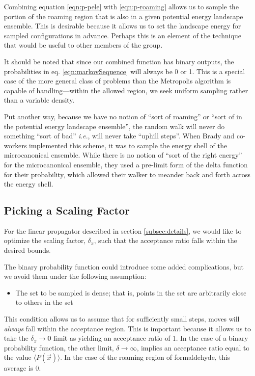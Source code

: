 \documentclass[letterpaper,12pt]{article}
\newcommand{\refeq}[1]{eq. \ref{eqn:#1}}
\begin{document}
Combining equation \ref{eqn:p-pele} with \ref{eqn:p-roaming} allows us to sample the portion of the roaming region that is also in a given potential energy landscape ensemble. This is desirable because it allows us to set the landscape energy for sampled configurations in advance. Perhaps this is an element of the technique that would be useful to other members of the group.

It should be noted that since our combined function has binary outputs, the probabilities in \refeq{markovSequence} will always be 0 or 1. This is a special case of the more general class of problems than the Metropolis algorithm is capable of handling---within the allowed region, we seek uniform sampling rather than a variable density.

Put another way, because we have no notion of ``sort of roaming'' or ``sort of in the potential energy landscape ensemble'', the random walk will never do something ``sort of bad'' \emph{i.e.}, will never take ``uphill steps''. When Brady and co-workers\cite{doll:1981} implemented this scheme, it was to sample the energy shell of the microcanonical ensemble. While there is no notion of ``sort of the right energy'' for the microcanonical ensemble, they used a pre-limit form of the delta function for their probability, which allowed their walker to meander back and forth across the energy shell.

\subsection{Picking a Scaling Factor}\label{subsec:pick-constant}
For the linear propagator described in section \ref{subsec:details}, we would like to optimize the scaling factor, $\delta_x$, such that the acceptance ratio falls within the desired bounds.

The binary probability function could introduce some added complications, but we avoid them under the following assumption:
\begin{itemize}
\item The set to be sampled is dense; that is, points in the set are arbitrarily close to others in the set
\end{itemize}
This condition allows us to assume that for sufficiently small steps, moves will \emph{always} fall within the acceptance region. This is important because it allows us to take the $\delta_x \to 0$ limit as yielding an acceptance ratio of 1. In the case of a binary probability function, the other limit, $\delta \to \infty$, implies an acceptance ratio equal to the value $\langle P(\vec{x}) \rangle$. In the case of the roaming region of formaldehyde, this average is 0.
\end{document}
